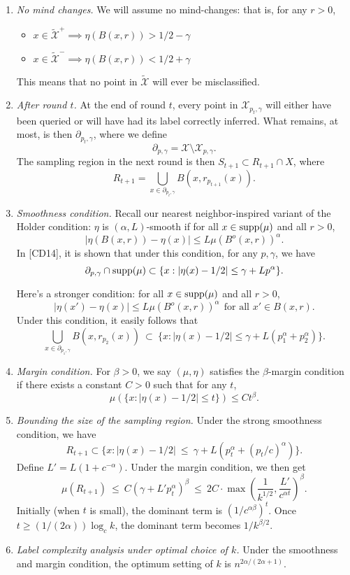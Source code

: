 \documentclass{article}
\def\X{{\mathcal X}}
\def\supp{{\rm supp}}
\begin{document}
\begin{enumerate}
\item {\it No mind changes.} We will assume no mind-changes: that is, for any $r>0$,
\begin{itemize}
\item $x \in \widetilde{\X}^+ \implies \eta(B(x,r)) > 1/2 - \gamma$
\item $x \in \widetilde{\X}^- \implies \eta(B(x,r)) < 1/2 + \gamma$
\end{itemize}
This means that no point in $\widetilde{\X}$ will ever be misclassified.

\item {\it After round $t$.} At the end of round $t$, every point in $\X_{p_t, \gamma}$ will either have been queried or will have had its label correctly inferred. What remains, at most, is then $\partial_{p_t, \gamma}$, where we define
$$ \partial_{p, \gamma} = \X \setminus \X_{p, \gamma} .$$
The sampling region in the next round is then $S_{t+1} \subset R_{t+1} \cap X$, where
$$ R_{t+1} = \bigcup_{x \in \partial_{p_t, \gamma}} B(x, r_{p_{t+1}}(x))  .$$

\item {\it Smoothness condition.} Recall our nearest neighbor-inspired variant of the Holder condition: $\eta$ is $(\alpha, L)$-smooth if for all $x \in \supp(\mu)$ and all $r > 0$,
$$ |\eta(B(x,r)) - \eta(x)| \leq L \mu(B^o(x,r))^\alpha .$$
In [CD14], it is shown that under this condition, for any $p, \gamma$, we have
$$ \partial_{p,\gamma} \cap \supp(\mu) \subset \{x: |\eta(x) - 1/2| \leq \gamma + Lp^\alpha\} .$$

Here's a stronger condition: for all $x \in \supp(\mu)$ and all $r > 0$,
$$ |\eta(x') - \eta(x)| \leq L \mu(B^o(x,r))^\alpha \ \ \mbox{for all $x' \in B(x,r)$}.$$
Under this condition, it easily follows that
$$ \bigcup_{x \in \partial_{p_1, \gamma}} B(x, r_{p_2}(x)) \ \subset \ \{x: |\eta(x) - 1/2| \leq \gamma + L(p_1^\alpha + p_2^\alpha)\} .$$
\item {\it Margin condition.} For $\beta > 0$, we say $(\mu, \eta)$ satisfies the $\beta$-margin condition if there exists a constant $C > 0$ such that for any $t$,
$$ \mu(\{x: |\eta(x) - 1/2| \leq t\}) \leq C t^\beta .$$

\item {\it Bounding the size of the sampling region.} Under the strong smoothness condition, we have
$$ R_{t+1} \subset  \{x: |\eta(x) - 1/2| 
\ \leq \ 
\gamma + L(p_t^\alpha + (p_t/c)^\alpha)\} .$$
Define $L' = L(1 + c^{-\alpha})$. Under the margin condition, we then get
$$ \mu(R_{t+1}) 
\ \leq \ 
C (\gamma + L' p_t^\alpha)^\beta 
\ \leq \ 
2C \cdot \max \left(\frac{1}{k^{1/2}}, \frac{L'}{c^{\alpha t}} \right)^\beta.
$$
Initially (when $t$ is small), the dominant term is $(1/c^{\alpha \beta})^t$. Once $t \geq (1/(2 \alpha)) \log_c k$, the dominant term becomes $1/k^{\beta/2}$.

\item {\it Label complexity analysis under optimal choice of $k$.} Under the smoothness and margin condition, the optimum setting of $k$ is $n^{2\alpha/(2\alpha+1)}$. 


\end{enumerate}
\end{document}
